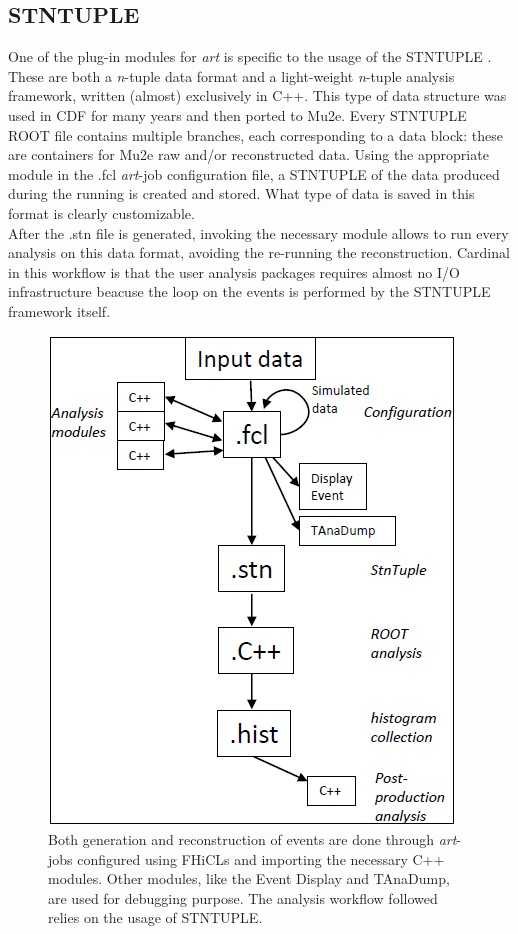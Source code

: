 \documentclass[12pt,a4paper,openright, oneside, titlepage]{book} %
\begin{document}
\subsection{STNTUPLE}
One of the plug-in modules for \textit{art} is specific to the usage of the STNTUPLE \cite{stntuple}\cite{stntuple:giani}.
These are both a \textit{n}-tuple data format and a light-weight \textit{n}-tuple analysis framework, written (almost) exclusively in C++. 
This type of data structure was used in CDF for many years and then ported to Mu2e. 
Every STNTUPLE ROOT file contains multiple branches, each corresponding to a data block: these are containers for Mu2e raw and/or reconstructed data. 
Using the appropriate module in the .fcl \textit{art}-job configuration file, a STNTUPLE of the data produced during the running is created and stored. 
What type of data is saved in this format is clearly customizable.\\
After the .stn file is generated, invoking the necessary module allows to run every analysis on this data format, avoiding the re-running the reconstruction. Cardinal in this workflow is that the user analysis packages requires almost no I/O infrastructure beacuse the loop on the events is performed by the STNTUPLE framework itself.

\begin{figure}[h!]
\centering
\includegraphics[scale=0.8]{mu2e_datahandling}
\caption[Mu2e simulation and data handling]{Both generation and reconstruction of events are done through \textit{art}-jobs configured using FHiCLs and importing the necessary C++ modules. 
Other modules, like the Event Display and TAnaDump, are used for debugging purpose.
The analysis workflow followed relies on the usage of STNTUPLE.}
\label{_mu2e_datahandling}
\end{figure}
\end{document}
